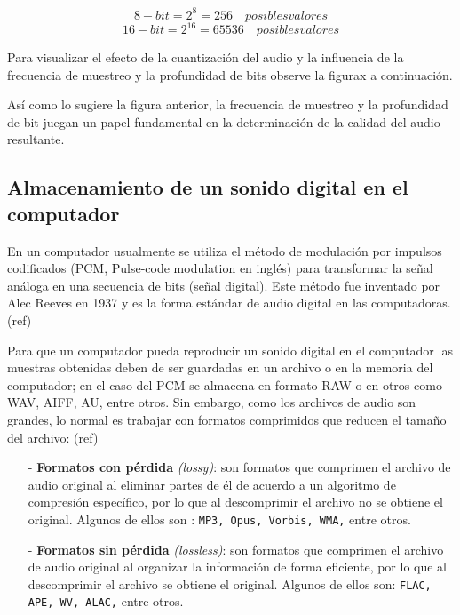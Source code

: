 \documentclass[conference,onecolumn]{IEEEtran}
\begin{document}
\[8-bit = 2^8 = 256 \quad posibles valores\]
\[16-bit = 2^{16} = 65536 \quad posibles valores\]

Para visualizar el efecto de la cuantización del audio y la influencia de la frecuencia de muestreo y la profundidad de bits observe la figurax a continuación.


Así como lo sugiere la figura anterior, la frecuencia de muestreo y la profundidad de bit juegan un papel fundamental en la determinación de la calidad del audio resultante.

\subsection{Almacenamiento de un sonido digital en el computador}
En un computador usualmente se utiliza el método de modulación por impulsos codificados (PCM, Pulse-code modulation en inglés) para transformar la señal análoga en una secuencia de bits (señal digital). Este método fue inventado por Alec Reeves en 1937 y es la forma estándar de audio digital en las computadoras. (ref) 

Para que un computador pueda reproducir un sonido digital en el computador las muestras obtenidas deben de ser guardadas en un archivo o en la memoria del computador; en el caso del PCM se almacena en formato RAW o en otros como WAV, AIFF, AU, entre otros. Sin embargo, como los archivos de audio son grandes, lo normal es trabajar con formatos comprimidos que reducen el tamaño del archivo: (ref) \\

\begin{itemize} %

    \item[-] \textbf{Formatos con pérdida} \textit{(lossy)}: son formatos que comprimen el archivo de audio original al eliminar partes de él de acuerdo a un algoritmo de compresión específico, por lo que al descomprimir el archivo no se obtiene el original. Algunos de ellos son : \texttt{MP3, Opus, Vorbis, WMA,} entre otros.
    \item[-] \textbf{Formatos sin pérdida} \textit{(lossless)}: son formatos que comprimen el archivo de audio original al organizar la información de forma eficiente, por lo que al descomprimir el archivo se obtiene el original. Algunos de ellos son: \texttt{FLAC, APE, WV, ALAC,} entre otros.

\end{itemize}
\end{document}
